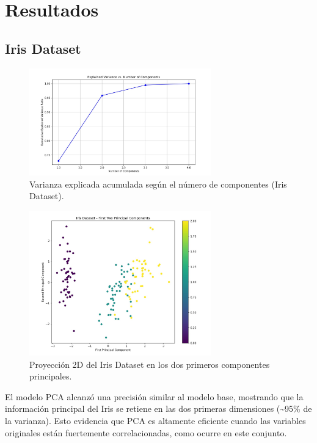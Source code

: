 \documentclass[12pt]{article}
\begin{document}
\section{Resultados}

\subsection{Iris Dataset}
\begin{figure}[H]
\centering
\includegraphics[width=0.7\textwidth]{figures/iris_explained_variance.png}
\caption{Varianza explicada acumulada según el número de componentes (Iris Dataset).}
\end{figure}

\begin{figure}[H]
\centering
\includegraphics[width=0.7\textwidth]{figures/iris_pca_projection.png}
\caption{Proyección 2D del Iris Dataset en los dos primeros componentes principales.}
\end{figure}

El modelo PCA alcanzó una precisión similar al modelo base, mostrando que la información principal del Iris se retiene en las dos primeras dimensiones (\textasciitilde95\% de la varianza). Esto evidencia que PCA es altamente eficiente cuando las variables originales están fuertemente correlacionadas, como ocurre en este conjunto.
\end{document}

